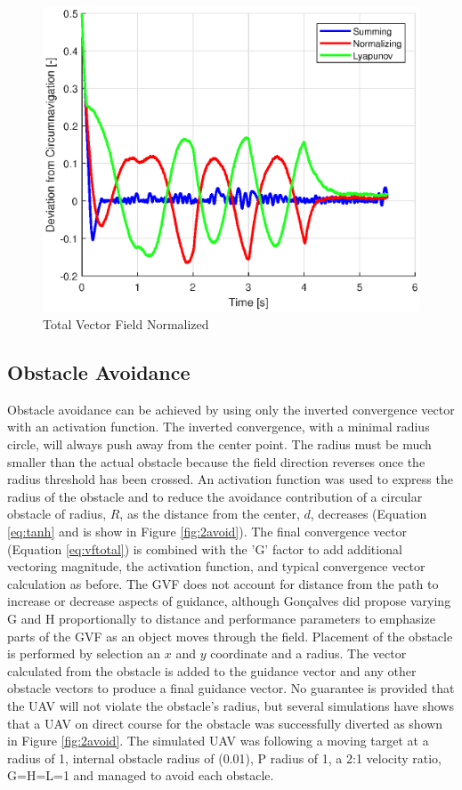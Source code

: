 \documentclass[conf]{new-aiaa}
\begin{document}
\begin{figure}[H]
	\centering
	\includegraphics[width=0.7\linewidth]{moving3uaverror.eps}
	\caption{Total Vector Field Normalized}
	\label{fig:move_error}
\end{figure}

\subsection{Obstacle Avoidance}
Obstacle avoidance can be achieved by using only the inverted convergence vector with an activation function. The inverted convergence, with a minimal radius circle, will always push away from the center point. The radius must be much smaller than the actual obstacle because the field direction reverses once the radius threshold has been crossed. An activation function was used to express the radius of the obstacle and to reduce the avoidance contribution of a circular obstacle of radius, $R$, as the distance from the center, $d$, decreases (Equation \ref{eq:tanh} and is show in Figure \ref{fig:2avoid}). The final convergence vector (Equation \ref{eq:vftotal}) is combined with the 'G' factor to add additional vectoring magnitude, the activation function, and typical convergence vector calculation as before. The GVF does not account for distance from the path to increase or decrease aspects of guidance, although Gon\c{c}alves did propose varying G and H proportionally to distance and performance parameters to emphasize parts of the GVF as an object moves through the field. Placement of the obstacle is performed by selection an $x$ and $y$ coordinate and a radius. The vector calculated from the obstacle is added to the guidance vector and any other obstacle vectors to produce a final guidance vector. No guarantee is provided that the UAV will not violate the obstacle's radius, but several simulations have shows that a UAV on direct course for the obstacle was successfully diverted as shown in Figure \ref{fig:2avoid}. The simulated UAV was following a moving target at a radius of 1, internal obstacle radius of (0.01), P radius of 1, a 2:1 velocity ratio, G=H=L=1 and managed to avoid each obstacle.
\end{document}
